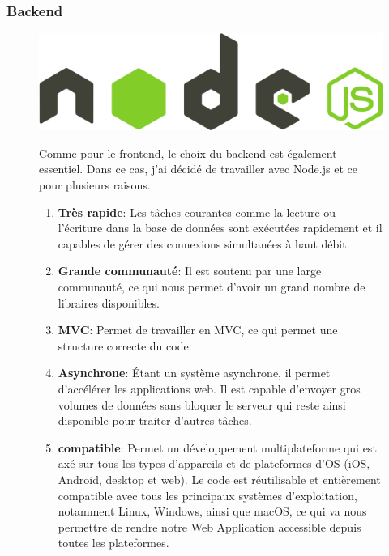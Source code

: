 \subsubsection{Backend}
\begin{figure}[H]
  \begin{minipage}{.3\textwidth}
    \includegraphics[width=0.75\linewidth]{img/node.png} 
  \end{minipage}
  \begin{minipage}{.7\textwidth}

    Comme pour le frontend, le choix du backend est également essentiel. Dans ce cas, j'ai décidé de travailler avec Node.js et ce pour plusieurs raisons.
    \begin{enumerate}
      \item \textbf{Très rapide}: Les tâches courantes comme la lecture ou l’écriture dans la base de données sont exécutées rapidement et il capables de gérer des connexions simultanées à haut débit.
      \item \textbf{Grande communauté}: Il est soutenu par une large communauté, ce qui nous permet d'avoir un grand nombre de libraires disponibles.
      \item \textbf{MVC}: Permet de travailler en MVC, ce qui permet une structure correcte du code.
      \item \textbf{Asynchrone}: Étant un système asynchrone, il permet d’accélérer les applications web. Il est capable d'envoyer gros volumes de données sans bloquer le serveur qui reste ainsi disponible pour traiter d’autres tâches.
      \item \textbf{compatible}: Permet un développement multiplateforme qui est axé sur tous les types d'appareils et de plateformes d'OS (iOS, Android, desktop et web). Le code est réutilisable et entièrement compatible avec tous les principaux systèmes d'exploitation, notamment Linux, Windows, ainsi que macOS, ce qui va nous permettre de rendre notre Web Application accessible depuis toutes les plateformes.
    \end{enumerate}

  \end{minipage}
\end{figure}


